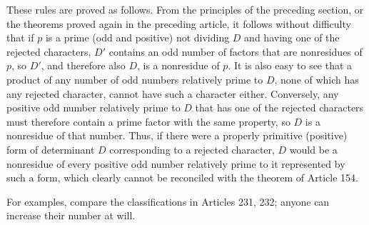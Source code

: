 These rules are proved as follows. From the principles of the preceding section, or the theorems proved again in the preceding article, it follows without difficulty that if $p$ is a prime (odd and positive) not dividing $D$ and having one of the rejected characters, $D'$ contains an odd number of factors that are nonresidues of $p$, so $D'$, and therefore also $D$, is a nonresidue of $p$. It is also easy to see that a product of any number of odd numbers relatively prime to $D$, none of which has any rejected character, cannot have such a character either. Conversely, any positive odd number relatively prime to $D$ that has one of the rejected characters must therefore contain a prime factor with the same property, so $D$ is a nonresidue of that number. Thus, if there were a properly primitive (positive) form of determinant $D$ corresponding to a rejected character, $D$ would be a nonresidue of every positive odd number relatively prime to it represented by such a form, which clearly cannot be reconciled with the theorem of Article 154.

For examples, compare the classifications in Articles 231, 232; anyone can increase their number at will.

